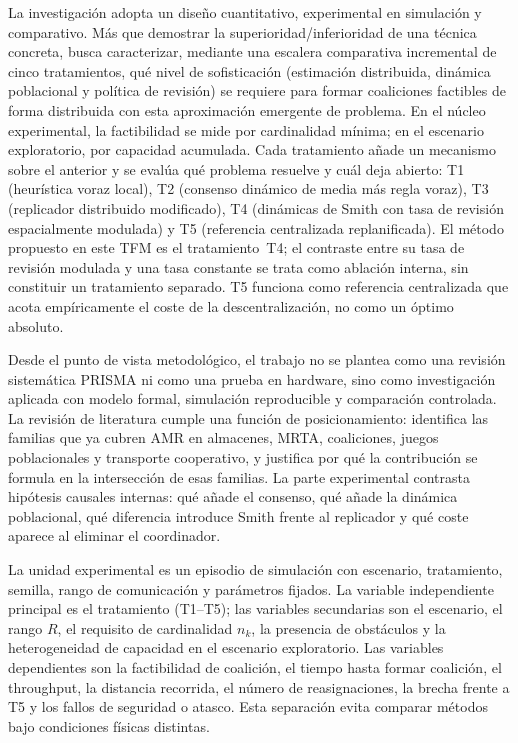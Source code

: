 La investigación adopta un diseño cuantitativo, experimental en simulación y
comparativo. Más que demostrar la superioridad/inferioridad de una técnica concreta, busca
caracterizar, mediante una escalera comparativa incremental de cinco tratamientos,
qué nivel de sofisticación (estimación distribuida, dinámica poblacional y política
de revisión) se requiere para formar coaliciones factibles de forma distribuida con esta aproximación emergente de problema. En el
núcleo experimental, la factibilidad se mide por cardinalidad mínima; en el escenario
exploratorio, por capacidad acumulada. Cada tratamiento
añade un mecanismo sobre el anterior y se evalúa qué problema resuelve y cuál
deja abierto: T1 (heurística voraz local), T2 (consenso dinámico de media más
regla voraz), T3 (replicador distribuido modificado), T4 (dinámicas de Smith con
tasa de revisión espacialmente modulada) y T5 (referencia centralizada
replanificada). El método propuesto en este TFM es el tratamiento~T4; el
contraste entre su tasa de revisión modulada y una tasa constante se trata como
ablación interna, sin constituir un tratamiento separado. T5 funciona como
referencia centralizada que acota empíricamente el coste de la descentralización,
no como un óptimo absoluto.

Desde el punto de vista metodológico, el trabajo no se plantea como una revisión
sistemática PRISMA ni como una prueba en hardware, sino como investigación aplicada con
modelo formal, simulación reproducible y comparación controlada. La revisión de
literatura cumple una función de posicionamiento: identifica las familias que ya cubren
AMR en almacenes, MRTA, coaliciones, juegos poblacionales y transporte cooperativo,
y justifica por qué la contribución se formula en la intersección de esas familias. La
parte experimental contrasta hipótesis causales internas: qué añade el consenso, qué
añade la dinámica poblacional, qué diferencia introduce Smith frente al replicador y qué
coste aparece al eliminar el coordinador.



La unidad experimental es un episodio de simulación con escenario, tratamiento, semilla,
rango de comunicación y parámetros fijados. La variable independiente principal es el
tratamiento (T1--T5); las variables secundarias son el escenario, el rango $R$, el
requisito de cardinalidad $n_k$, la presencia de obstáculos y la heterogeneidad de
capacidad en el escenario exploratorio. Las variables dependientes son la factibilidad
de coalición, el tiempo hasta formar coalición, el throughput, la distancia recorrida,
el número de reasignaciones, la brecha frente a T5 y los fallos de seguridad o
atasco. Esta separación evita comparar métodos bajo condiciones físicas distintas.

